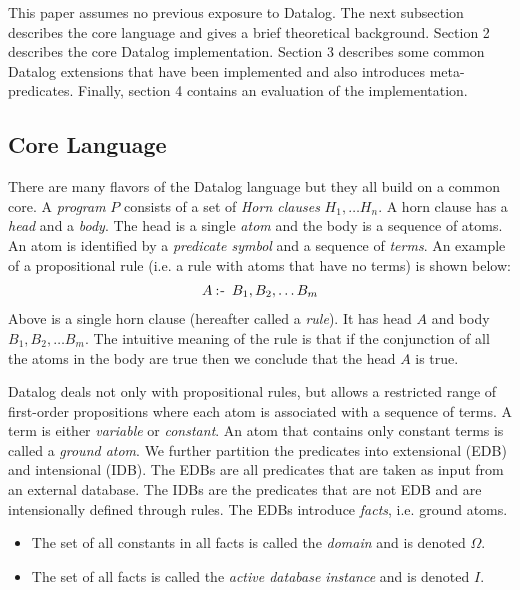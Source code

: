 This paper assumes no previous exposure to Datalog. The next subsection describes the core language and gives a brief theoretical background. Section 2 describes the core Datalog implementation. Section 3 describes some common Datalog extensions that have been implemented and also introduces meta-predicates. Finally, section 4 contains an evaluation of the implementation.

\subsection{Core Language}
There are many flavors of the Datalog language but they all build on a common core. A \textit{program} $P$ consists of a set of \textit{Horn clauses} $H_1, \ldots H_n$. A horn clause has a \textit{head} and a \textit{body}. The head is a single \textit{atom} and the body is a sequence of atoms. An atom is identified by a \textit{predicate symbol} and a sequence of \textit{terms}. An example of a propositional rule (i.e. a rule with atoms that have no terms) is shown below:
\vspace*{-5pt}
\begin{align*}
A \mathbin{:\hspace{-0.5ex}\textsf{-}} \;B_1, B_2, \ldots B_m
\end{align*}
\noindent
Above is a single horn clause (hereafter called a \textit{rule}). It has head $A$ and body $B_1, B_2, \ldots B_m$. The intuitive meaning of the rule is that if the conjunction of all the atoms in the body are true then we conclude that the head $A$ is true.

Datalog deals not only with propositional rules, but allows a restricted range of first-order propositions where each atom is associated with a sequence of terms. A term is either \textit{variable} or \textit{constant}. An atom that contains only constant terms is called a \textit{ground atom}. We further partition the predicates into extensional (EDB) and intensional (IDB). The EDBs are all predicates that are taken as input from an external database. The IDBs are the predicates that are not EDB and are intensionally defined through rules. The EDBs introduce \textit{facts}, i.e. ground atoms. 

\begin{itemize}
\item The set of all constants in all facts is called the \textit{domain} and is denoted $\Omega$.
\item The set of all facts is called the \textit{active database instance} and is denoted $I$.
\end{itemize}
 
